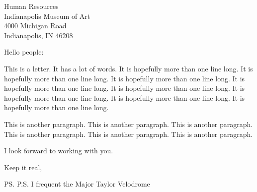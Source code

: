 \documentclass[letterpaper]{letter}        %
\begin{document}

\begin{letter}{%
  Human Resources\\
  Indianapolis Museum of Art\\
  4000 Michigan Road\\
  Indianapolis, IN 46208%
  }

\opening{Hello people:}
  \telephone{}
  This is a letter.  It has a lot of words. %
  It is hopefully more than one line long. %
  It is hopefully more than one line long. %
  It is hopefully more than one line long. %
  It is hopefully more than one line long. %
  It is hopefully more than one line long. %
  It is hopefully more than one line long. %
  It is hopefully more than one line long. %
  It is hopefully more than one line long.

  This is another paragraph. %
  This is another paragraph. %
  This is another paragraph. %
  This is another paragraph. %
  This is another paragraph. %
  This is another paragraph.

  I look forward to working with you.

\closing{Keep it real,}
\ps{P.S. I frequent the Major Taylor Velodrome}

\end{letter}
\end{document}
